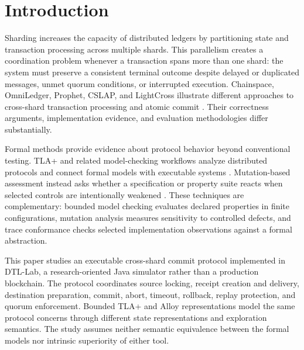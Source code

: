 \section{Introduction}
\label{sec:introduction}

Sharding increases the capacity of distributed ledgers by partitioning state
and transaction processing across multiple shards. This parallelism creates a
coordination problem whenever a transaction spans more than one shard: the
system must preserve a consistent terminal outcome despite delayed or
duplicated messages, unmet quorum conditions, or interrupted execution.
Chainspace, OmniLedger, Prophet, CSLAP, and LightCross illustrate different
approaches to cross-shard transaction processing and atomic commit
\cite{albassam2018chainspace,kokoriskogias2018omniledger,hong2023prophet,du2024cslap,qi2024lightcross}.
Their correctness arguments, implementation evidence, and evaluation
methodologies differ substantially.

Formal methods provide evidence about protocol behavior beyond conventional
testing. TLA+ and related model-checking workflows analyze distributed
protocols and connect formal models with executable systems
\cite{schultz2025mongodb,cirstea2025traces,hackett2025tracelink,howard2025ccf,wang2023mocket,gao2025imocket}.
Mutation-based assessment instead asks whether a specification or property
suite reacts when selected controls are intentionally weakened
\cite{cordy2023mutation}. These techniques are complementary: bounded model
checking evaluates declared properties in finite configurations, mutation
analysis measures sensitivity to controlled defects, and trace conformance
checks selected implementation observations against a formal abstraction.

This paper studies an executable cross-shard commit protocol implemented in
DTL-Lab, a research-oriented Java simulator rather than a production
blockchain. The protocol coordinates source locking, receipt creation and
delivery, destination preparation, commit, abort, timeout, rollback, replay
protection, and quorum enforcement. Bounded TLA+ and Alloy representations
model the same protocol concerns through different state representations and
exploration semantics. The study assumes neither semantic equivalence between
the formal models nor intrinsic superiority of either tool.

